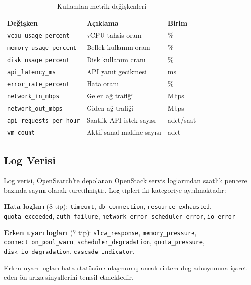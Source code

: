 \begin{table}[htbp]
    \centering
    \caption{Kullanılan metrik değişkenleri}
    \label{tab:metrikler}
    \begin{tabular}{lll}
        \textbf{Değişken} & \textbf{Açıklama} & \textbf{Birim} \\
        \hline
        \texttt{vcpu\_usage\_percent}   & vCPU tahsis oranı      & \% \\
        \texttt{memory\_usage\_percent} & Bellek kullanım oranı  & \% \\
        \texttt{disk\_usage\_percent}   & Disk kullanım oranı    & \% \\
        \texttt{api\_latency\_ms}       & API yanıt gecikmesi    & ms \\
        \texttt{error\_rate\_percent}   & Hata oranı             & \% \\
        \texttt{network\_in\_mbps}      & Gelen ağ trafiği       & Mbps \\
        \texttt{network\_out\_mbps}     & Giden ağ trafiği       & Mbps \\
        \texttt{api\_requests\_per\_hour} & Saatlik API istek sayısı & adet/saat \\
        \texttt{vm\_count}              & Aktif sanal makine sayısı & adet \\
    \end{tabular}
\end{table}

\subsection{Log Verisi}

Log verisi, OpenSearch'te depolanan OpenStack servis loglarından saatlik pencere bazında sayım olarak türetilmiştir.
Log tipleri iki kategoriye ayrılmaktadır:

\textbf{Hata logları} (8 tip): \texttt{timeout}, \texttt{db\_connection}, \texttt{resource\_exhausted}, \texttt{quota\_exceeded}, \texttt{auth\_failure}, \texttt{network\_error}, \texttt{scheduler\_error}, \texttt{io\_error}.

\textbf{Erken uyarı logları} (7 tip): \texttt{slow\_response}, \texttt{memory\_pressure}, \texttt{connection\_pool\_warn}, \texttt{scheduler\_degradation}, \texttt{quota\_pressure}, \texttt{disk\_io\_degradation}, \texttt{cascade\_indicator}.

Erken uyarı logları hata statüsüne ulaşmamış ancak sistem degradasyonuna işaret eden ön-arıza sinyallerini temsil etmektedir.

